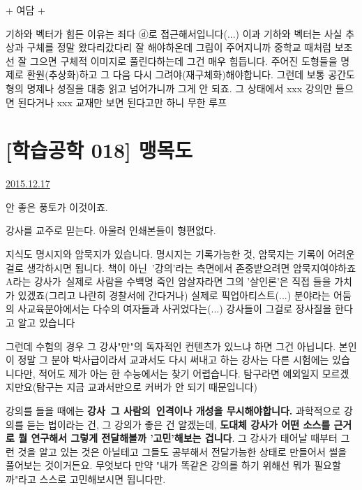+ 여담 +
\vspace{5mm}

기하와 벡터가 힘든 이유는 죄다 ⓓ로 접근해서입니다(...)
이과 기하와 벡터는 사실 추상과 구체를 정말 왔다리갔다리 잘 해야하온데
그림이 주어지니까 중학교 때처럼 보조선 잘 그으면 구체적 이미지로 풀린다하는데 그건 매우 힘듭니다.
주어진 도형들을 명제로 환원(추상화)하고 그 다음 다시 그려야(재구체화)해야합니다.
그런데 보통 공간도형의 명제나 성질을 대충 읽고 넘어가니까 그게 안 되죠.
그 상태에서 xxx 강의만 들으면 된다거나 xxx 교재만 보면 된다고만 하니 무한 루프
\vspace{5mm}






\section{[학습공학 018] 맹목도}
\href{https://www.kockoc.com/Apoc/550110}{2015.12.17}

\vspace{5mm}

안 좋은 풍토가 이것이죠.
\vspace{5mm}

강사를 교주로 믿는다. 아울러 인쇄본들이 형편없다.
\vspace{5mm}

지식도 명시지와 암묵지가 있습니다. 명시지는 기록가능한 것, 암묵지는 기록이 어려운 걸로 생각하시면 됩니다.
책이 아닌 '강의'라는 측면에서 존중받으려면 암묵지여야하죠
A라는 강사가 실제로 사람을 수백명 죽인 암살자라면 그의 '살인론'은 직접 들을 가치가 있겠죠(그리고 나란히 경찰서에 간다거나)
실제로 픽업아티스트(...) 분야라는 어둠의 사교육분야에서는 다수의 여자들과 사귀었다는(...) 강사들이 그걸로 장사질을 한다고 알고 있습니다
\vspace{5mm}

그런데 수험의 경우 그 강사"만"의 독자적인 컨텐츠가 있느냐 하면 그건 아닙니다.
본인이 정말 그 분야 박사급이라서 교과서도 다시 써내고 하는 강사는 다른 시험에는 있습니다만,
적어도 제가 아는 한 수능에서는 찾기 어렵습니다. 탐구라면 예외일지 모르겠지만요(탐구는 지금 교과서만으로 커버가 안 되기 때문입니다)
\vspace{5mm}

강의를 들을 때에는 \textbf{강사 그 사람의 인격이나 개성을 무시해야합니다.}
과학적으로 강의를 듣는 법이라는 건,
그 강의가 좋은 건 알겠는데, \textbf{도대체 강사가 어떤 소스를 근거로 뭘 연구해서 그렇게 전달해볼까 '고민'해보는 겁니다}.
그 강사가 태어날 때부터 그런 것을 알고 있는 것은 아닐테고 그들도 공부해서 전달가능한 상태로 만들어서 썰을 풀어보는 것이거든요.
무엇보다 만약 "내가 똑같은 강의를 하기 위해선 뭐가 필요할까"라고 스스로 고민해보시면 됩니다만.
\vspace{5mm}

